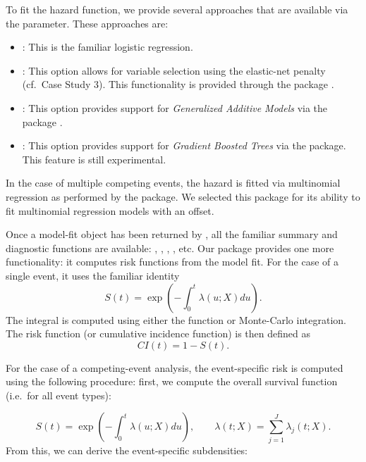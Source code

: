 \documentclass[
]{jss}
\providecommand{\tightlist}{%
  \setlength{\itemsep}{0pt}\setlength{\parskip}{0pt}}
\begin{document}
To fit the hazard function, we provide several approaches that are
available via the  parameter. These approaches are:

\begin{itemize}
\tightlist
\item
  : This is the familiar logistic regression.
\item
  : This option allows for variable selection using the
  elastic-net \citep{zou2005regularization} penalty (cf.~Case Study 3).
  This functionality is provided through the  package
  \citep{friedman2010jss}.
\item
  : This option provides support for \emph{Generalized
  Additive Models} via the  package
  \citep{hastie1987generalized}.
\item
  : This option provides support for \emph{Gradient Boosted
  Trees} via the  package. This feature is still experimental.
\end{itemize}

In the case of multiple competing events, the hazard is fitted via
multinomial regression as performed by the  package. We
selected this package for its ability to fit multinomial regression
models with an offset.

Once a model-fit object has been returned by , all
the familiar summary and diagnostic functions are available:
, , , , etc. Our
package provides one more functionality: it computes risk functions from
the model fit. For the case of a single event, it uses the familiar
identity \begin{equation}\label{eqn:surv}
S(t) = \exp\left(-\int_0^t \lambda(u;X) du\right).
\end{equation} The integral is computed using either the
 function or Monte-Carlo integration. The risk
function (or cumulative incidence function) is then defined as
\begin{equation}\label{eqn:CI}
CI(t) = 1 - S(t).
\end{equation}

For the case of a competing-event analysis, the event-specific risk is
computed using the following procedure: first, we compute the overall
survival function (i.e.~for all event types):

\[ S(t) = \exp\left(-\int_0^t \lambda(u;X) du\right),\qquad \lambda(t;X) = \sum_{j=1}^J \lambda_j(t;X).\]
From this, we can derive the event-specific subdensities:
\end{document}
